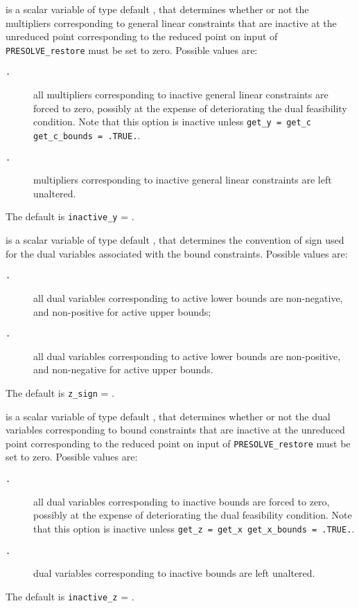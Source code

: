 \documentclass{galahad}
\newcommand{\packagename}{PRESOLVE}
\newcommand{\sym}{\tt\small}
\begin{document}
\begin{description}
 is a scalar variable of type default \integer, that
determines whether or not the multipliers corresponding
to general linear constraints that are inactive at the unreduced point
corresponding to the reduced point on input of {\tt \packagename\_restore}
must be set to zero. Possible values are:
\begin{description}
\item[\sym \galsymforcetozero.] all multipliers corresponding to inactive
                     general linear constraints are forced to zero,
                     possibly at the expense of deteriorating the
                     dual feasibility condition.
                     Note that this option is inactive unless
                     {\tt get\_y = get\_c get\_c\_bounds = .TRUE.}.
\item[\sym \galsymleaveasis.] multipliers corresponding to inactive
                   general linear constraints are left unaltered.
\end{description}
The default is {\tt inactive\_y} = {\sym \galsymleaveasis}.

is a scalar variable of type default \integer, that
determines the convention of sign used for the dual
variables associated with the bound constraints. Possible values are:
\begin{description}
\item[\sym \galsympositive.] all dual variables corresponding to
                active lower bounds are non-negative, and
                non-positive for active upper bounds;
\item[\sym \galsymnegative.] all dual variables corresponding to
                active lower bounds are non-positive, and
               non-negative for active upper bounds.
\end{description}
The default is {\tt z\_sign} = {\sym \galsympositive}.

 is a scalar variable of type default \integer, that
determines whether or not the dual variables corresponding
to bound constraints that are inactive at the unreduced point
corresponding to the reduced point on input of {\tt \packagename\_restore}
must be set to zero. Possible values are:
\begin{description}
\item[\sym \galsymforcetozero.] all dual variables corresponding to inactive
                     bounds are forced to zero,
                     possibly at the expense of deteriorating the
                     dual feasibility condition.
                     Note that this option is inactive unless
                     {\tt get\_z = get\_x get\_x\_bounds = .TRUE.}.
\item[\sym \galsymleaveasis.] dual variables corresponding to inactive
                   bounds are left unaltered.
\end{description}
The default is {\tt inactive\_z} = {\sym \galsymleaveasis}.


\end{description}
\end{document}
